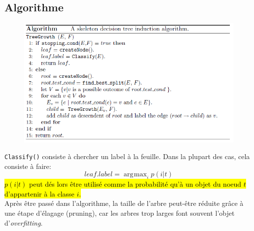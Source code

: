 \documentclass[letterpaper, 12pt]{article}
\newcommand{\alinea}{
\hspace*{0.5cm}}
\DeclareMathOperator*{\argmax}{\arg\!\max}
\begin{document}
		\subsection{Algorithme}
			\begin{figure}[H]
				\centering
				\includegraphics[scale=0.8]{Images/tree_algo.png}
				\caption{}\label{fig:tree:algo}
			\end{figure}\noindent
			\verb|Classify()| consiste à chercher un label à 
			la feuille. Dans la plupart des cas, cela consiste à faire:
			$$leaf.label = \argmax_{i}{p(i|t)}$$
			\hl{$p(i|t)$ peut dés lors être utilisé comme la probabilité
			qu'à un objet du noeud $t$ d'appartenir à la classe $i$.}\\
			\alinea Après être passé dans l'algorithme, la taille de l'arbre
				peut-être réduite grâce à une étape d'élagage (pruning),
				car les arbres trop larges font souvent l'objet
				d'\textit{overfitting}.
\end{document}
